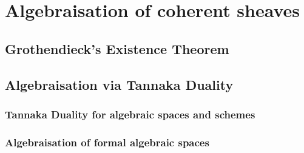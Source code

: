 \section{Algebraisation of coherent sheaves}
    \subsection{Grothendieck's Existence Theorem}

    \subsection{Algebraisation via Tannaka Duality}
        \subsubsection{Tannaka Duality for algebraic spaces and schemes}
        
        \subsubsection{Algebraisation of formal algebraic spaces}